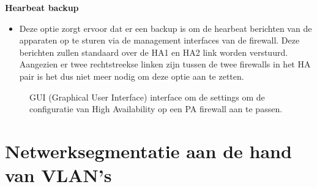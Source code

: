 \textbf{Hearbeat backup}
    \begin{itemize}[label=\textbullet]
        \item Deze optie zorgt ervoor dat er een backup is om de hearbeat berichten van de apparaten op te sturen via de management interfaces van de firewall. Deze berichten zullen standaard over de HA1 en HA2 link worden verstuurd. Aangezien er twee rechtstreekse linken zijn tussen de twee firewalls in het HA pair is het dus niet meer nodig om deze optie aan te zetten.
    \end{itemize}


\begin{figure}[H]
    \centering
    \caption[PA High Availability settings]{\label{fig:grail}GUI (Graphical User Interface) interface om de settings om de configuratie van High Availability op een PA firewall aan te passen.}
\end{figure}


\section{Netwerksegmentatie aan de hand van VLAN’s}

